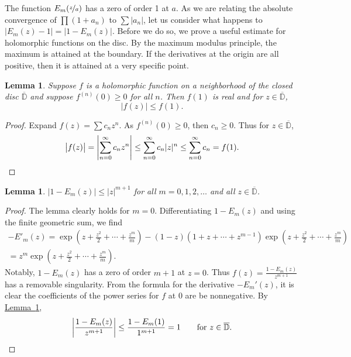 \documentclass[12pt,openany]{book}
\newcommand{\sabs}[1]{\lvert {#1} \rvert}
\newcommand{\babs}[1]{\bigl\lvert {#1} \bigr\rvert}
\newcommand{\abs}[1]{\left\lvert {#1} \right\rvert}
\newcommand{\D}{{\mathbb{D}}}
\theoremstyle{plain}
\newtheorem{lemma}[thm]{Lemma}
\theoremstyle{remark}
\theoremstyle{definition}
\theoremstyle{exercise}
\theoremstyle{example}
\newcommand{\lemmaref}[1]{\hyperref[#1]{Lemma~\ref*{#1}}}
\begin{document}
The function $E_m(\nicefrac{z}{a})$ has a zero of order 1 at $a$.
As we are relating the absolute convergence of $\prod (1+a_n)$ to $\sum
\sabs{a_n}$, let us consider what happens to $\babs{E_m(z)-1}=\babs{1-E_m(z)}$.
Before we do so, we prove a useful estimate for holomorphic functions
on the disc.
By the maximum modulus principle, the maximum is attained at the boundary.
If the derivatives at the origin are all positive, then it is attained
at a very specific point.

\begin{lemma} \label{lemma:maxprincpositive}
Suppose $f$ is a holomorphic function on a neighborhood of the closed
disc $\overline{\D}$ and suppose $f^{(n)}(0) \geq 0$ for all $n$.
Then $f(1)$ is real and for $z \in \overline{\D}$,
\begin{equation*}
\babs{f(z)} \leq f(1) .
\end{equation*}
\end{lemma}

\begin{proof}
Expand $f(z) = \sum c_n z^n$.  As $f^{(n)}(0) \geq 0$,
then $c_n \geq 0$.
Thus for $z \in \overline{\D}$,
\begin{equation*}
\babs{f(z)} =
\abs{\sum_{n=0}^\infty c_n z^n}
\leq
\sum_{n=0}^\infty c_n \sabs{z}^n
\leq
\sum_{n=0}^\infty c_n = f(1) .  \qedhere
\end{equation*}
\end{proof}

\begin{lemma} \label{lemma:elemfactbound}
$\sabs{1-E_m(z)} \leq \sabs{z}^{m+1}$ for all $m = 0,1,2,\ldots$ and all 
$z \in \overline{\D}$.
\end{lemma}

\begin{proof}
The lemma clearly holds for $m=0$.
Differentiating $1-E_m(z)$ and using the finite geometric sum, we find
\begin{multline*}
-E'_m(z) =
\exp\left( z +\frac{z^2}{2} + \cdots + \frac{z^m}{m} \right)
-
(1-z) (1 +z  + \cdots + z^{m-1} ) \exp\left( z +\frac{z^2}{2} + \cdots + \frac{z^m}{m} \right)
\\
=
z^m \exp\left( z +\frac{z^2}{2} + \cdots + \frac{z^m}{m} \right) .
\end{multline*}
Notably, $1-E_m(z)$ has a zero of order $m+1$ at $z=0$.  Thus $f(z) =
\frac{1-E_m(z)}{z^{m+1}}$ has a removable singularity.  From the formula for
the derivative $-E_m'(z)$, it is clear the coefficients of the power series
for $f$ at $0$ are be nonnegative.  By \lemmaref{lemma:maxprincpositive},
\begin{equation*}
\abs{\frac{1-E_m(z)}{z^{m+1}}} \leq
\frac{1-E_m(1)}{1^{m+1}} = 1
\qquad \text{for $z \in \overline{\D}$}.  \qedhere
\end{equation*}
\end{proof}
\end{document}
